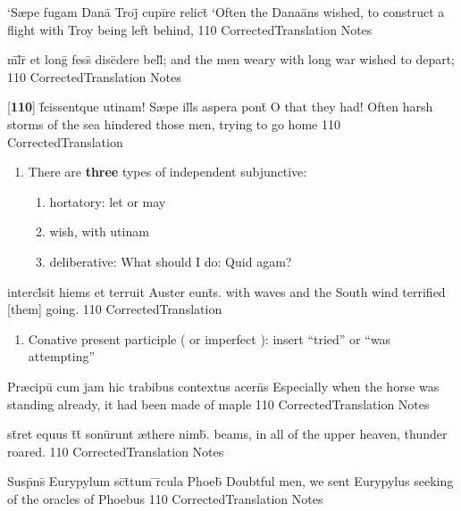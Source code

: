 \latline
  {`S{\ae}pe fugam Dana\={\macron {\i}} Troj\={} cupi\={}re relict\={}}
  { `Often the Dana\"ans wished, to construct a flight with Troy being left behind, }
  {110}
  { CorrectedTranslation }
  { Notes }


\latline
  {m\={}l\={\macron {\i}}r\={\macron {\i}} et long\={} fess\={\macron {\i}} disc\={}dere bell\={};}
  { and the men weary with long war wished to depart; }
  {110}
  { CorrectedTranslation }
  { Notes }


\latline
  {[\textbf{110}] f\={}cissentque utinam!  S{\ae}pe ill\={}s aspera pont\={\macron {\i}}}
  { O that they had!  Often harsh storms of the sea hindered those men, trying to go home }
  {110}
  { CorrectedTranslation }
  { \begin{enumerate}
  	\item There are \textbf{three} types of independent subjunctive:
		\begin{enumerate}
	  	\item hortatory:  let or may
	  	\item wish, with utinam
	  	\item deliberative:  What should I do:  Quid agam?
		\end{enumerate}
  \end{enumerate} }


\latline
  {intercl\={}sit hiems et terruit Auster eunt\={\macron {\i}}s.}
  { with waves and the South wind terrified [them] going. }
  {110}
  { CorrectedTranslation }
  { \begin{enumerate}
  	\item Conative present participle ( or imperfect ):  insert ``tried'' or ``was attempting''
  \end{enumerate} }


\latline
  {Pr{\ae}cipu\={} cum jam hic trabibus contextus acern\={\macron {\i}}s}
  { Especially when the horse was standing already, it had been made of maple   }
  {110}
  { CorrectedTranslation }
  { Notes }


\latline
  {st\={}ret equus t\={}t\={} sonu\={}runt {\ae}there nimb\={\macron {\i}}.}
  { beams, in all of the upper heaven, thunder roared.  }
  {110}
  { CorrectedTranslation }
  { Notes }


\latline
  {Susp\={}ns\={\macron {\i}} Eurypylum sc\={\macron {\i}}t\={}tum \={}r\={}cula Phoeb\={\macron {\i}}}
  { Doubtful men, we sent Eurypylus seeking of the oracles of Phoebus}
  {110}
  { CorrectedTranslation }
  { Notes }


